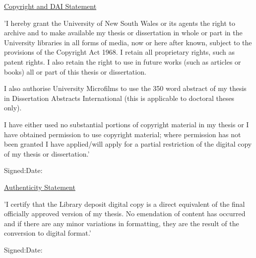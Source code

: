 
\newpage
\thispagestyle{empty}
\null\vfill
\begin{center}
\begin{minipage}{13cm}
\setlength{\parindent}{0cm}
\setlength{\parskip}{2ex}
{\underline{Copyright and DAI Statement}}
\par
{\rmfamily\normalsize
'I hereby grant the University of New South Wales or its agents the 
right to archive and to make available my thesis or dissertation in  
whole or part in the University libraries in all forms of media, now 
or here after known, subject to the provisions of the Copyright Act 1968. 
I retain all proprietary rights, such as patent rights. I also retain the 
right to use in future works (such as articles or books) all or part of 
this thesis or dissertation. 

I also authorise University Microfilms to use the 350 word abstract of 
my thesis in Dissertation Abstracts International (this is applicable to 
doctoral theses only).        

I have either used no substantial portions of copyright material in my 
thesis or I have obtained permission to use copyright material; where 
permission has not been granted I have applied/will apply for a 
partial restriction of the digital copy of my thesis or dissertation.'
}
\par
{\rmfamily\normalsize
Signed:\hrulefill\hspace{1cm}Date:\hrulefill
}
\par
\vspace{1.5cm}
{\underline{Authenticity Statement}}
\par
{\rmfamily\normalsize
'I certify that the Library deposit digital copy is a direct equivalent of 
the final officially approved version of my thesis. No emendation of 
content has occurred and if there are any minor variations in  
formatting, they are the result of the conversion to digital format.'
}
\par
{\rmfamily\normalsize
Signed:\hrulefill\hspace{1cm}Date:\hrulefill
}
\end{minipage}
\end{center}
\vfill\null
